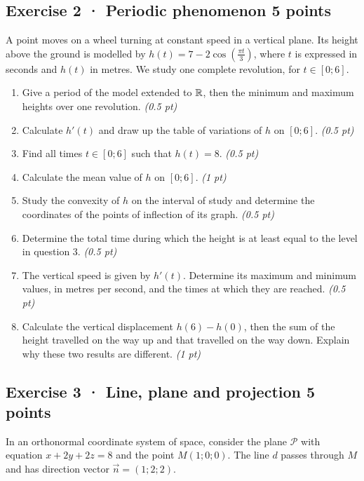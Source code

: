 \subsection*{Exercise 2 · Periodic phenomenon \hfill 5 points}A point moves on a wheel turning at constant speed in a vertical plane. Its height above the ground is modelled by $h(t)=7-2\cos\left(\frac{\pi t}{3}\right)$, where $t$ is expressed in seconds and $h(t)$ in metres. We study one complete revolution, for $t\in[0;6]$.

\begin{enumerate}

\item Give a period of the model extended to $\mathbb R$, then the minimum and maximum heights over one revolution. \hfill\textit{(0.5 pt)}

\item Calculate $h'(t)$ and draw up the table of variations of $h$ on $[0;6]$. \hfill\textit{(0.5 pt)}

\item Find all times $t\in[0;6]$ such that $h(t)=8$. \hfill\textit{(0.5 pt)}

\item Calculate the mean value of $h$ on $[0;6]$. \hfill\textit{(1 pt)}

\item Study the convexity of $h$ on the interval of study and determine the coordinates of the points of inflection of its graph. \hfill\textit{(0.5 pt)}

\item Determine the total time during which the height is at least equal to the level in question 3. \hfill\textit{(0.5 pt)}

\item The vertical speed is given by $h'(t)$. Determine its maximum and minimum values, in metres per second, and the times at which they are reached. \hfill\textit{(0.5 pt)}

\item Calculate the vertical displacement $h(6)-h(0)$, then the sum of the height travelled on the way up and that travelled on the way down. Explain why these two results are different. \hfill\textit{(1 pt)}

\end{enumerate}

\clearpage{}\par

\subsection*{Exercise 3 · Line, plane and projection \hfill 5 points}In an orthonormal coordinate system of space, consider the plane $\mathcal P$ with equation $x+2y+2z=8$ and the point $M(1;0;0)$. The line $d$ passes through $M$ and has direction vector $\vec n=(1;2;2)$.

